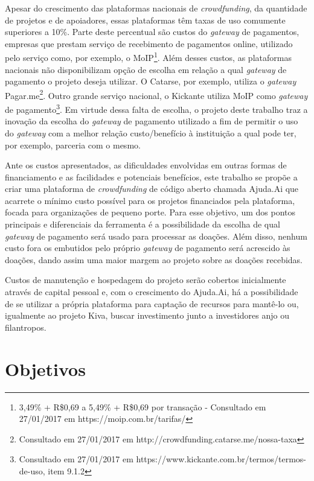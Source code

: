 Apesar do crescimento das plataformas nacionais de \emph{crowdfunding}, da quantidade de projetos e de apoiadores, essas plataformas têm taxas de uso comumente superiores a 10\%. Parte deste percentual são custos do \emph{gateway} de pagamentos, empresas que prestam serviço de recebimento de pagamentos online, utilizado pelo serviço como, por exemplo, o MoIP\footnote{3,49\% + R\$0,69 a 5,49\% + R\$0,69 por transação - Consultado em 27/01/2017 em https://moip.com.br/tarifas/}. Além desses custos, as plataformas nacionais não disponibilizam opção de escolha em relação a qual \emph{gateway} de pagamento o projeto deseja utilizar. O Catarse, por exemplo, utiliza o \emph{gateway} Pagar.me\footnote{Consultado em 27/01/2017 em http://crowdfunding.catarse.me/nossa-taxa}. Outro grande serviço nacional, o Kickante utiliza MoIP como \emph{gateway} de pagamento\footnote{Consultado em 27/01/2017 em https://www.kickante.com.br/termos/termos-de-uso, item 9.1.2}. Em virtude dessa falta de escolha, o projeto deste trabalho traz a inovação da escolha do \emph{gateway} de pagamento utilizado a fim de permitir o uso do \emph{gateway} com a melhor relação custo/benefício à instituição a qual pode ter, por exemplo, parceria com o mesmo.

Ante os custos apresentados, as dificuldades envolvidas em outras formas de financiamento e as facilidades e potenciais benefícios, este trabalho se propõe a criar uma plataforma de \emph{crowdfunding} de código aberto chamada Ajuda.Ai que acarrete o mínimo custo possível para os projetos financiados pela plataforma, focada para organizações de pequeno porte. Para esse objetivo, um dos pontos principais e diferenciais da ferramenta é a possibilidade da escolha de qual \emph{gateway} de pagamento será usado para processar as doações. Além disso, nenhum custo fora os embutidos pelo próprio \emph{gateway} de pagamento será acrescido às doações, dando assim uma maior margem ao projeto sobre as doações recebidas.

Custos de manutenção e hospedagem do projeto serão cobertos inicialmente através de capital pessoal e, com o crescimento do Ajuda.Ai, há a possibilidade de se utilizar a própria plataforma para captação de recursos para mantê-lo ou, igualmente ao projeto Kiva, buscar investimento junto a investidores anjo ou filantropos.



\section{Objetivos}

